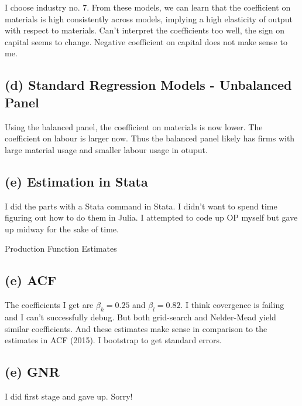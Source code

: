 \documentclass[11pt]{article}
\begin{document}
I choose industry no. 7.
From these models, we can learn that
the coefficient on materials is high consistently across models, implying a high elasticity of output with respect to materials.
Can't interpret the coefficients too well, the sign on capital seems to change. Negative coefficient on capital does not make sense to me.

\subsection*{(d) Standard Regression Models - Unbalanced Panel}

Using the balanced panel, the coefficient on materials is now lower. 
The coefficient on labour is larger now. 
Thus the balanced panel likely has firms with large material usage and smaller labour usage in otuput. 

\clearpage
\subsection*{(e) Estimation in Stata}

I did the parts with a Stata command in Stata. 
I didn't want to spend time figuring out how to do them in Julia. 
I attempted to code up OP myself but gave up midway for the sake of time. 

\begin{table}[ht]
    \centering
    \small
    \setlength{\tabcolsep}{2pt}
    
    \caption{Production Function Estimates}
    \label{tab:prod_est}
\end{table}

\subsection*{(e) ACF}
The coefficients I get are $\beta_k = 0.25$ and $\beta_l = 0.82$. 
I think covergence is failing and I can't successfully debug. 
But both grid-search and Nelder-Mead yield similar coefficients. 
And these estimates make sense in comparison to the estimates in ACF (2015). 
I bootstrap to get standard errors. 

\subsection*{(e) GNR}
I did first stage and gave up. Sorry!
\end{document}
